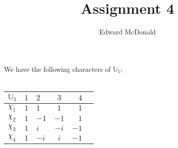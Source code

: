 \documentclass{unswmaths}
\begin{document}
\subject{Number Theory}
\author{Edward McDonald}
\title{Assignment 4}


\setlength\parindent{0pt}

\newcommand{\Unit}{\mathbb{U}}
\newcommand{\modulo}[1]{\;\operatorname{mod}\;#1}
\newcommand{\pprime}{{p\text{ prime}}}

\unswtitle{}

    
    \begin{definition}
    \label{allChars}
        We have the following characters of $\Unit_5$:
        \\
        \\        
        \begin{tabular}{| l | cl  cr | r |}
        \hline
        $\Unit_5$ & $1$ & $2$ & $3$ & $4$\\
        \hline
        $\chi_1$  & $1$ & $1$ & $1$ & $1$\\
        $\chi_2$  & $1$ & $-1$ & $-1$ & $1$\\
        $\chi_3$  & $1$ & $i$ & $-i$ & $-1$\\
        $\chi_4$  & $1$ & $-i$ & $i$ & $-1$\\
        \hline
        \end{tabular}
    \end{definition}
    
\end{document}

